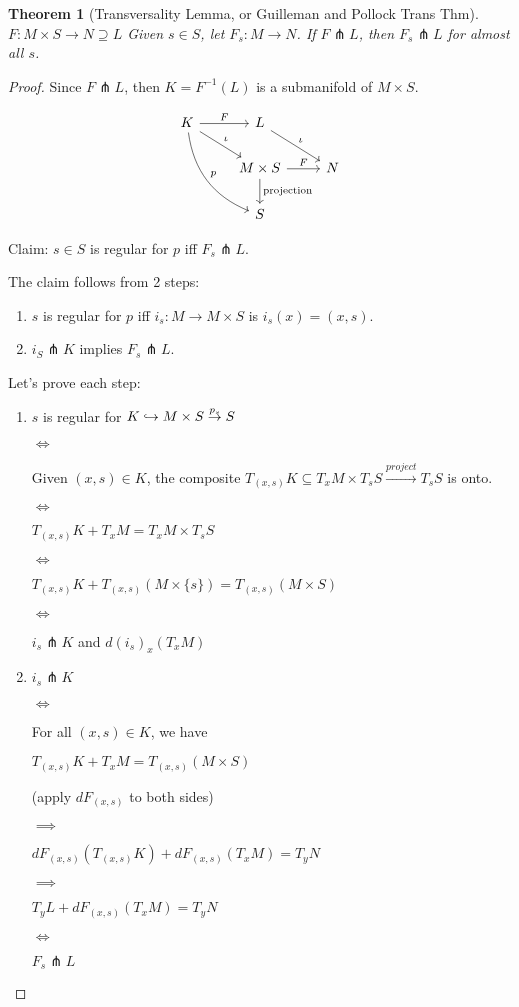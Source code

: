 \documentclass[11pt]{amsbook}
\theoremstyle{mystyle} \newtheorem{thrm}[thm]{Theorem}
\theoremstyle{mystyle} \newtheorem{defi}[thm]{Definition}
\theoremstyle{mystyle} \newtheorem{coro}[thm]{Corollary}
\theoremstyle{mystyle} \newtheorem{propo}[thm]{Proposition}
\theoremstyle{mystyle} \newtheorem{lemm}[thm]{Lemma}
\numberwithin{thm}{section}
\newcommand{\transverse}{\pitchfork}
\newcommand{\x}{\times}
\begin{document}
\begin{thrm}[Transversality Lemma, or Guilleman and Pollock Trans Thm]
	$F: M \x S \to N \supseteq L$
	Given $s \in S$, let $F_s: M \to N$.
	If $F \transverse L$, then $F_s \transverse L$ for almost all $s$.
\end{thrm}
\begin{proof}
	Since $F \transverse L$, then $K = F^{-1}(L)$ is a submanifold of $M \x S$.

	$$\begin{tikzcd}
		K \arrow[r, "F"] \arrow[rd, "\iota"] \arrow[rdd, "p", bend right] & L \arrow[rd, "\iota"] \\
		 & M \x S \arrow[r, "F"] \arrow[d, "\text{projection}"] & N \\
		 & S
	\end{tikzcd}$$

	Claim: $s \in S$ is regular for $p$ iff $F_s \transverse L$.

	The claim follows from 2 steps:
	\begin{enumerate}
		\item $s$ is regular for $p$ iff $i_s: M \to M \x S$ is $i_s(x) = (x,s)$.
		\item $i_S \transverse K$ implies $F_s \transverse L$.
	\end{enumerate}

	Let's prove each step:
	\begin{enumerate}
		\item
			$s$ is regular for $K \into M \x S \overset{p_s}{\to} S$

			$\iff$

			Given $(x,s) \in K$, the composite $T_{(x,s)}K \subseteq T_xM \x T_sS \overset{project}{\to} T_sS$ is onto.

			$\iff$

			$T_{(x,s)}K + T_xM = T_xM \x T_sS$

			$\iff$

			$T_{(x,s)}K + T_{(x,s)}(M \x \{s\}) = T_{(x,s)}(M \x S)$

			$\iff$

			$i_s \transverse K$ and $d(i_s)_x(T_xM)$
		\item
			$i_s \transverse K$

			$\iff$

			For all $(x,s) \in K$, we have

			$T_{(x,s)}K + T_xM = T_{(x,s)}(M \x S)$

			(apply $dF_{(x,s)}$ to both sides)

			$\implies$

			$dF_{(x,s)}(T_{(x,s)}K) + dF_{(x,s)}(T_xM) = T_yN$

			$\implies$

			$T_yL + dF_{(x,s)}(T_xM) = T_yN$

			$\iff$

			$F_s \transverse L$
	\end{enumerate}
\end{proof}
\end{document}
